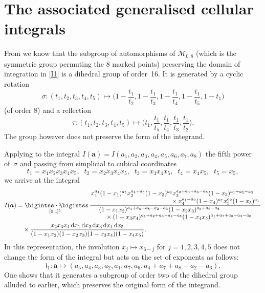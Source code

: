 \documentclass[12pt,reqno]{amsart}
\theoremstyle{remark}
\renewcommand{\d}{{\mathrm d}}
\newcommand\ba{\boldsymbol a}
\newcommand\fri{\mathfrak i}
\begin{document}
\section{The associated generalised cellular integrals}
\label{sec3}

From \cite{Br16} we know that the subgroup of automorphisms of $\mathcal{M}_{0,8}$ (which is the symmetric group permuting the 8 marked points) preserving the domain of integration in \eqref{I1} is a dihedral group of order~16.
It is generated by a cyclic rotation
\[
\sigma\colon(t_1,t_2,t_3,t_4,t_5)
\mapsto\bigg(1-\frac{t_1}{t_2},1-\frac{t_1}{t_3},1-\frac{t_1}{t_4},1-\frac{t_1}{t_5},1-t_1\bigg)
\]
(of order 8) and a  reflection
\[
\tau\colon(t_1,t_2,t_3,t_4,t_5)
\mapsto\bigg(t_1,\frac{t_1}{t_5},\frac{t_1}{t_4},\frac{t_1}{t_3},\frac{t_1}{t_2}\bigg).
\]
The group however does not preserve the form of the integrand.

Applying to the integral $I(\ba)=I(a_1,a_2,a_3,a_4,a_5,a_6,a_7,a_8)$ the fifth power of~$\sigma$ and passing from  simplicial to cubical coordinates 
\[
t_1=x_1x_2x_3x_4x_5, \;\; t_2=x_2x_3x_4x_5, \;\; t_3=x_3x_4x_5, \;\; t_4=x_4x_5, \;\; t_5=x_5,
\]
we arrive at the integral 
\begin{align}
I(\ba)
&=\mathop{\bigintss\!\!\dotsb\!\!\bigintss}_{[0,1]^5\;\;}
\frac{\splitfrac{x_1^{a_4}(1-x_1)^{a_5}x_2^{a_4 + a_5}(1-x_2)^{a_6}x_3^{a_2 + a_3 + a_6 - a_8}(1-x_3)^{a_1  + a_5 - a_3}}{\times x_4^{a_1 + a_2}(1-x_4)^{a_7}x_5^{a_2}(1-x_5)^{a_1}}}
{\splitfrac{(1-x_1x_2)^{ a_4 + a_5 + a_8 - a_2 - a_3}(1-x_2x_3)^{a_5 + a_6 - a_8}}{\times(1-x_3x_4)^{a_1 + a_2+ a_6 - a_4  - a_8}(1-x_4x_5)^{a_1 + a_7 + a_8 - a_3 - a_6 }}}
\nonumber\\ &\quad\times
\frac{x_2x_3x_4\,\d x_1\,\d x_2\,\d x_3\,\d x_4\,\d x_5}{(1-x_1x_2)(1-x_2x_3)(1-x_3x_4)(1-x_4x_5)}.
\label{I-a}
\end{align}
In this representation, the involution $x_j\mapsto x_{6-j}$ for $j=1,2,3,4,5$ does not change the form of the integral but acts on the set of exponents as follows:
\begin{equation}
\fri_1\colon\ba\mapsto(a_5,a_4,a_3,a_2,a_1,a_7,a_6,  a_4  + a_7 + a_8 - a_2  - a_6  ).
\label{i1a}
\end{equation}
One shows that it generates  a subgroup of order two of the dihedral group alluded to earlier, which preserves the original form of the integrand.
\end{document}
